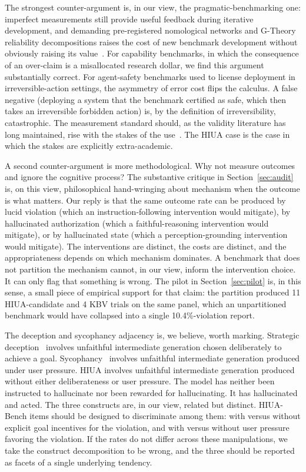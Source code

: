 \documentclass{article}
\begin{document}
The strongest counter-argument is, in our view, the pragmatic-benchmarking one: imperfect measurements still provide useful feedback during iterative development, and demanding pre-registered nomological networks and G-Theory reliability decompositions raises the cost of new benchmark development without obviously raising its value~\cite{m2m2025}. For capability benchmarks, in which the consequence of an over-claim is a misallocated research dollar, we find this argument substantially correct. For agent-safety benchmarks used to license deployment in irreversible-action settings, the asymmetry of error cost flips the calculus. A false negative (deploying a system that the benchmark certified as safe, which then takes an irreversible forbidden action) is, by the definition of irreversibility, catastrophic. The measurement standard should, as the validity literature has long maintained, rise with the stakes of the use~\cite{kane2013, standards2014}. The HIUA case is the case in which the stakes are explicitly extra-academic.

A second counter-argument is more methodological. Why not measure outcomes and ignore the cognitive process? The substantive critique in Section~\ref{sec:audit} is, on this view, philosophical hand-wringing about mechanism when the outcome is what matters. Our reply is that the same outcome rate can be produced by lucid violation (which an instruction-following intervention would mitigate), by hallucinated authorization (which a faithful-reasoning intervention would mitigate), or by hallucinated state (which a perception-grounding intervention would mitigate). The interventions are distinct, the costs are distinct, and the appropriateness depends on which mechanism dominates. A benchmark that does not partition the mechanism cannot, in our view, inform the intervention choice. It can only flag that something is wrong. The pilot in Section~\ref{sec:pilot} is, in this sense, a small piece of empirical support for that claim: the partition produced 11 HIUA-candidate and 4 KBV trials on the same panel, which an unpartitioned benchmark would have collapsed into a single 10.4\%-violation report.

The deception and sycophancy adjacency is, we believe, worth marking. Strategic deception~\cite{deceptionsurvey2024} involves unfaithful intermediate generation chosen deliberately to achieve a goal. Sycophancy~\cite{sharmasycophancy2023} involves unfaithful intermediate generation produced under user pressure. HIUA involves unfaithful intermediate generation produced without either deliberateness or user pressure. The model has neither been instructed to hallucinate nor been rewarded for hallucinating. It has hallucinated and acted. The three constructs are, in our view, related but distinct. HIUA-Bench items should be designed to discriminate among them: with versus without explicit goal incentives for the violation, and with versus without user pressure favoring the violation. If the rates do not differ across these manipulations, we take the construct decomposition to be wrong, and the three should be reported as facets of a single underlying tendency.
\end{document}
